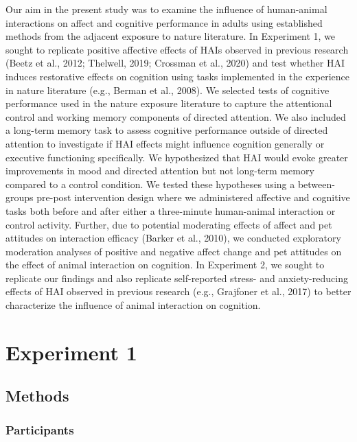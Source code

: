 \documentclass[
  english,
  pub,floatsintext]{apa6}
\begin{document}
Our aim in the present study was to examine the influence of human-animal interactions on affect and cognitive performance in adults using established methods from the adjacent exposure to nature literature. In Experiment 1, we sought to replicate positive affective effects of HAIs observed in previous research (Beetz et al., 2012; Thelwell, 2019; Crossman et al., 2020) and test whether HAI induces restorative effects on cognition using tasks implemented in the experience in nature literature (e.g., Berman et al., 2008). We selected tests of cognitive performance used in the nature exposure literature to capture the attentional control and working memory components of directed attention. We also included a long-term memory task to assess cognitive performance outside of directed attention to investigate if HAI effects might influence cognition generally or executive functioning specifically. We hypothesized that HAI would evoke greater improvements in mood and directed attention but not long-term memory compared to a control condition. We tested these hypotheses using a between-groups pre-post intervention design where we administered affective and cognitive tasks both before and after either a three-minute human-animal interaction or control activity. Further, due to potential moderating effects of affect and pet attitudes on interaction efficacy (Barker et al., 2010), we conducted exploratory moderation analyses of positive and negative affect change and pet attitudes on the effect of animal interaction on cognition. In Experiment 2, we sought to replicate our findings and also replicate self-reported stress- and anxiety-reducing effects of HAI observed in previous research (e.g., Grajfoner et al., 2017) to better characterize the influence of animal interaction on cognition.

\hypertarget{experiment-1}{%
\section{Experiment 1}\label{experiment-1}}

\hypertarget{methods}{%
\subsection{Methods}\label{methods}}

\hypertarget{participants}{%
\subsubsection{Participants}\label{participants}}
\end{document}
